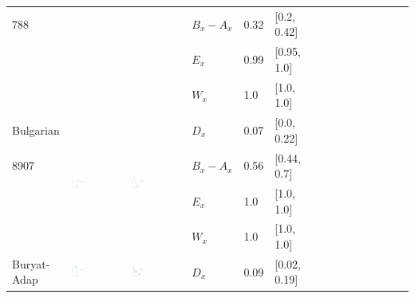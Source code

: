 \documentclass[11pt,letterpaper]{article}
\begin{document}
\begin{longtable}{lllllllllllllll}
788  &    &    &  $B_x-A_x$  &  0.32  &  [0.2, 0.42]  \\ 
  &    &    &  $E_x$  &  0.99  &  [0.95, 1.0]  \\ 
  &    &    &  $W_x$  &  1.0  &  [1.0, 1.0]  \\ [10.25ex] \hline
Bulgarian  &  \multirow{4}{*}{\includegraphics[width=0.25\textwidth]{figures/Bulgarian-entropy-memory.pdf}}  &  \multirow{4}{*}{\includegraphics[width=0.25\textwidth]{figures/Bulgarian-listener-surprisal-memory.pdf}}  &  $D_x$  &  0.07  &  [0.0, 0.22]  \\ 
8907  &    &    &  $B_x-A_x$  &  0.56  &  [0.44, 0.7]  \\ 
  &    &    &  $E_x$  &  1.0  &  [1.0, 1.0]  \\ 
  &    &    &  $W_x$  &  1.0  &  [1.0, 1.0]  \\ [10.25ex] \hline
Buryat-Adap  &  \multirow{4}{*}{\includegraphics[width=0.25\textwidth]{figures/Buryat-Adap-entropy-memory.pdf}}  &  \multirow{4}{*}{\includegraphics[width=0.25\textwidth]{figures/Buryat-Adap-listener-surprisal-memory.pdf}}  &  $D_x$  &  0.09  &  [0.02, 0.19]  \\ 

\end{longtable}
\end{document}
